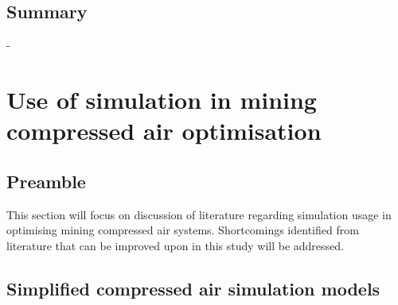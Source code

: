  	\subsection{Summary}-
\section{Use of simulation in mining compressed air optimisation}
\label{CompressorSimulation Literature}
\subsection{Preamble}
This section will focus on discussion of literature regarding simulation usage in optimising mining compressed air systems. Shortcomings identified from literature that can be improved upon in this study will be addressed.
\subsection{Simplified compressed air simulation models} \label{simplfiedModels}
